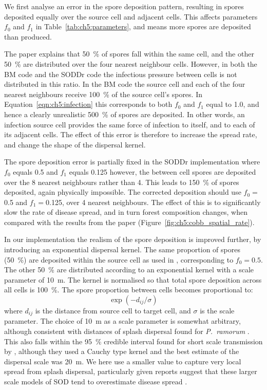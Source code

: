 We first analyse an error in the spore deposition pattern, resulting in spores deposited equally over the source cell and adjacent cells. This affects parameters $f_0$ and $f_1$ in Table~\ref{tab:ch5:parameters}, and means more spores are deposited than produced.

The paper explains that \SI{50}{\percent} of spores fall within the same cell, and the other \SI{50}{\percent} are distributed over the four nearest neighbour cells. However, in both the BM code and the SODDr code the infectious pressure between cells is not distributed in this ratio. In the BM code the source cell and each of the four nearest neighbours receive \SI{100}{\percent} of the source cell's spores. In Equation~\ref{eqn:ch5:infection} this corresponds to both $f_0$ and $f_1$ equal to \num{1.0}, and hence a clearly unrealistic \SI{500}{\percent} of spores are deposited. In other words, an infection source cell provides the same force of infection to itself, and to each of its adjacent cells. The effect of this error is therefore to increase the spread rate, and change the shape of the dispersal kernel.

The spore deposition error is partially fixed in the SODDr implementation where $f_0$ equals 0.5 and $f_1$ equals \num{0.125} however, the between cell spores are deposited over the 8 nearest neighbours rather than 4. This leads to \SI{150}{\percent} of spores deposited, again physically impossible. The corrected deposition should use $f_0=$\num{0.5} and $f_1=$\num{0.125}, over 4 nearest neighbours. The effect of this is to significantly slow the rate of disease spread, and in turn forest composition changes, when compared with the results from the paper (Figure~\ref{fig:ch5:cobb_spatial_rate}).

In our implementation the realism of the spore deposition is improved further, by introducing an exponential dispersal kernel. The same proportion of spores (\SI{50}{\percent}) are deposited within the source cell as used in \citet{cobb_ecosystem_2012}, corresponding to $f_0=\num{0.5}$. The other \SI{50}{\percent} are distributed according to an exponential kernel with a scale parameter of \SI{10}{\meter}. The kernel is normalised so that total spore deposition across all cells is \SI{100}{\percent}. The spore proportion between cells becomes proportional to:
\begin{equation}\label{eqn:ch5:spore_kernel}
    \exp{\left(-d_{ij}/\sigma\right)}
\end{equation}
where $d_{ij}$ is the distance from source cell to target cell, and $\sigma$ is the scale parameter. The choice of \SI{10}{\meter} as a scale parameter is somewhat arbitrary, although consistent with distances of splash dispersal found for \emph{P.~ramorum} \citep{davidson_transmission_2005}. This also falls within the \SI{95}{\percent} credible interval found for short scale transmission by \citet{meentemeyer_epidemiological_2011}, although they used a Cauchy type kernel and the best estimate of the dispersal scale was \SI{20}{\meter}. We here use a smaller value to capture very local spread from splash dispersal, particularly given reports suggest that these larger scale models of SOD tend to overestimate disease spread \citep{valachovic_well_2017}.

